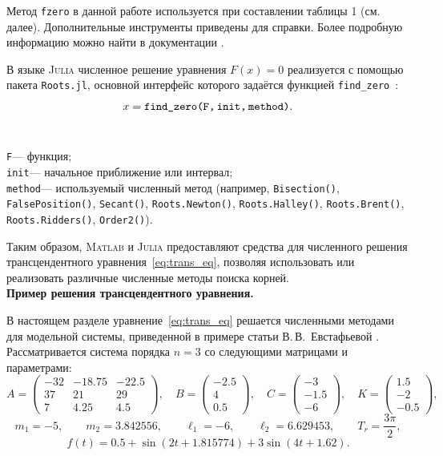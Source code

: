 \documentclass[12pt,a4paper]{article}
\theoremstyle{bigplain}
\theoremstyle{plain}
\begin{document}
Метод \texttt{fzero} в данной работе используется при составлении таблицы 1 (см. далее). 
Дополнительные инструменты приведены для справки.
Более подробную информацию можно найти в документации \cite{Matlab}.

\medskip

В языке \textsc{Julia} численное решение уравнения $F(x)=0$
реализуется с помощью пакета \texttt{Roots.jl}, основной
интерфейс которого задаётся функцией \texttt{find\_zero}~\cite{Julia}:
\[
x = \texttt{find\_zero(F,\,init,\,method)}.
\]
\\

\vspace{-1cm}
\begin{samepage}
\noindent
\texttt{F}\hspace{1.8em}--- функция;\\
\texttt{init}\hspace{1em}--- начальное приближение или интервал;\\
\texttt{method}\hspace{0.2em}--- используемый численный метод (например, \texttt{Bisection()}, \texttt{FalsePosition()}, \texttt{Secant()}, \texttt{Roots.Newton()}, \texttt{Roots.Halley()}, \texttt{Roots.Brent()}, \texttt{Roots.Ridders()}, \texttt{Order2()}).
\end{samepage}
\medskip

Таким образом, \textsc{Matlab} и \textsc{Julia}
предоставляют средства для численного решения
трансцендентного уравнения~\eqref{eq:trans_eq},
позволяя использовать или реализовать различные
численные методы поиска корней.
\\




\noindent\textbf{Пример решения трансцендентного уравнения.}

В настоящем разделе уравнение~\eqref{eq:trans_eq}
решается численными методами
для модельной системы, приведенной в примере статьи
В.\,В.~Евстафьевой \cite{Eustafieva}.
Рассматривается система порядка $n=3$
со следующими матрицами и параметрами:
\[
A=
\begin{pmatrix}
-32 & -18.75 & -22.5\\
37 & 21 & 29\\
7 & 4.25 & 4.5
\end{pmatrix},
\quad
B=
\begin{pmatrix}
-2.5\\ 4\\ 0.5
\end{pmatrix},
\quad
C=
\begin{pmatrix}
-3\\ -1.5\\ -6
\end{pmatrix},
\quad
K=
\begin{pmatrix}
1.5\\ -2\\ -0.5
\end{pmatrix},
\]
\[
m_1=-5,\qquad
m_2=3.842556,\qquad
\ell_1=-6,\qquad
\ell_2=6.629453,\qquad
T_r= \frac{3\pi}{2},
\]
\[
f(t)=0.5+\sin(2t+1.815774)+3\sin(4t+1.62).
\]
\end{document}
